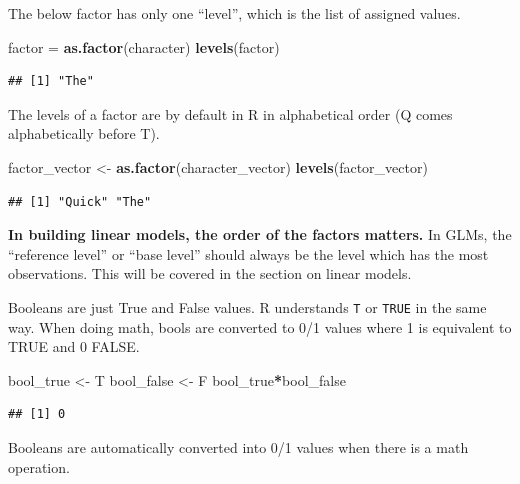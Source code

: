 \documentclass[openany]{book}
\newenvironment{Shaded}{\begin{snugshade}}{\end{snugshade}}
\newcommand{\KeywordTok}[1]{\textcolor[rgb]{0.13,0.29,0.53}{\textbf{#1}}}
\newcommand{\NormalTok}[1]{#1}
\newcommand{\OperatorTok}[1]{\textcolor[rgb]{0.81,0.36,0.00}{\textbf{#1}}}
\newcommand{\StringTok}[1]{\textcolor[rgb]{0.31,0.60,0.02}{#1}}
\begin{document}
The below factor has only one ``level'', which is the list of assigned values.

\begin{Shaded}
\begin{Highlighting}[]
\NormalTok{factor =}\StringTok{ }\KeywordTok{as.factor}\NormalTok{(character)}
\KeywordTok{levels}\NormalTok{(factor)}
\end{Highlighting}
\end{Shaded}

\begin{verbatim}
## [1] "The"
\end{verbatim}

The levels of a factor are by default in R in alphabetical order (Q comes alphabetically before T).

\begin{Shaded}
\begin{Highlighting}[]
\NormalTok{factor_vector <-}\StringTok{ }\KeywordTok{as.factor}\NormalTok{(character_vector)}
\KeywordTok{levels}\NormalTok{(factor_vector)}
\end{Highlighting}
\end{Shaded}

\begin{verbatim}
## [1] "Quick" "The"
\end{verbatim}

\textbf{In building linear models, the order of the factors matters.} In GLMs, the ``reference level'' or ``base level'' should always be the level which has the most observations. This will be covered in the section on linear models.

Booleans are just True and False values. R understands \texttt{T} or \texttt{TRUE} in the same way. When doing math, bools are converted to 0/1 values where 1 is equivalent to TRUE and 0 FALSE.

\begin{Shaded}
\begin{Highlighting}[]
\NormalTok{bool_true <-}\StringTok{ }\NormalTok{T}
\NormalTok{bool_false <-}\StringTok{ }\NormalTok{F}
\NormalTok{bool_true}\OperatorTok{*}\NormalTok{bool_false}
\end{Highlighting}
\end{Shaded}

\begin{verbatim}
## [1] 0
\end{verbatim}

Booleans are automatically converted into 0/1 values when there is a math operation.
\end{document}
